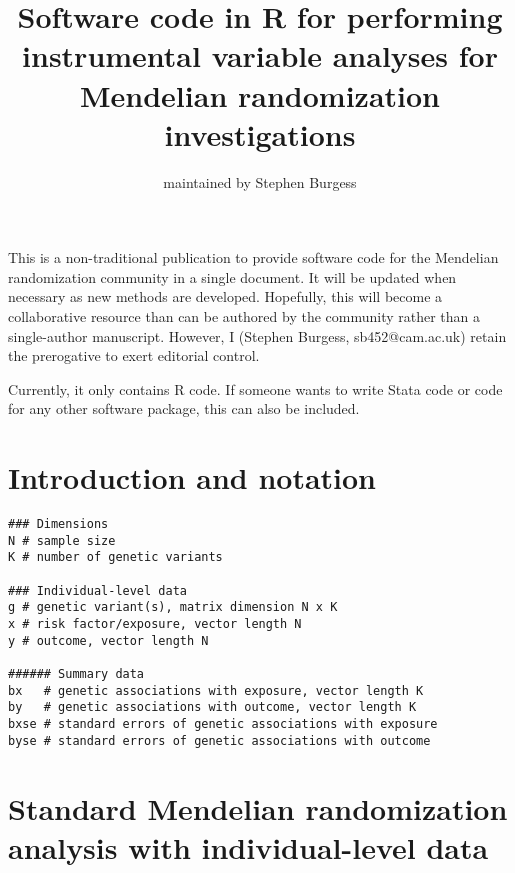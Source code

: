 \documentclass[a4paper,12pt]{article} %
\begin{document}
\title{Software code in R for performing instrumental variable analyses for Mendelian randomization investigations}
\author{maintained by Stephen Burgess}
\maketitle
This is a non-traditional publication to provide software code for the Mendelian randomization community in a single document. It will be updated when necessary as new methods are developed. Hopefully, this will become a collaborative resource than can be authored by the community rather than a single-author manuscript. However, I (Stephen Burgess, sb452@cam.ac.uk) retain the prerogative to exert editorial control.

Currently, it only contains R code. If someone wants to write Stata code or code for any other software package, this can also be included.

\clearpage

\tableofcontents %

\clearpage

\section{Introduction and notation}
\begin{lstlisting}
### Dimensions
N # sample size
K # number of genetic variants

### Individual-level data
g # genetic variant(s), matrix dimension N x K
x # risk factor/exposure, vector length N
y # outcome, vector length N

###### Summary data
bx   # genetic associations with exposure, vector length K
by   # genetic associations with outcome, vector length K
bxse # standard errors of genetic associations with exposure
byse # standard errors of genetic associations with outcome
\end{lstlisting}

\clearpage

\section{Standard Mendelian randomization analysis with individual-level data}
\end{document}

